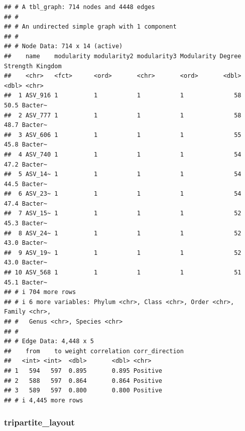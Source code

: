 \documentclass[
]{book}
\newenvironment{Shaded}{\begin{snugshade}}{\end{snugshade}}
\newcommand{\NormalTok}[1]{#1}
\newcommand{\SpecialCharTok}[1]{\textcolor[rgb]{0.81,0.36,0.00}{\textbf{#1}}}
\begin{document}
\begin{Shaded}
\end{Shaded}

\begin{verbatim}
## # A tbl_graph: 714 nodes and 4448 edges
## #
## # An undirected simple graph with 1 component
## #
## # Node Data: 714 x 14 (active)
##    name    modularity modularity2 modularity3 Modularity Degree Strength Kingdom
##    <chr>   <fct>      <ord>       <chr>       <ord>       <dbl>    <dbl> <chr>  
##  1 ASV_916 1          1           1           1              58     50.5 Bacter~
##  2 ASV_777 1          1           1           1              58     48.7 Bacter~
##  3 ASV_606 1          1           1           1              55     45.8 Bacter~
##  4 ASV_740 1          1           1           1              54     47.2 Bacter~
##  5 ASV_14~ 1          1           1           1              54     44.5 Bacter~
##  6 ASV_23~ 1          1           1           1              54     47.4 Bacter~
##  7 ASV_15~ 1          1           1           1              52     45.3 Bacter~
##  8 ASV_24~ 1          1           1           1              52     43.0 Bacter~
##  9 ASV_19~ 1          1           1           1              52     43.0 Bacter~
## 10 ASV_568 1          1           1           1              51     45.1 Bacter~
## # i 704 more rows
## # i 6 more variables: Phylum <chr>, Class <chr>, Order <chr>, Family <chr>,
## #   Genus <chr>, Species <chr>
## #
## # Edge Data: 4,448 x 5
##    from    to weight correlation corr_direction
##   <int> <int>  <dbl>       <dbl> <chr>         
## 1   594   597  0.895       0.895 Positive      
## 2   588   597  0.864       0.864 Positive      
## 3   589   597  0.800       0.800 Positive      
## # i 4,445 more rows
\end{verbatim}

\subsubsection{tripartite\_layout}\label{tripartite_layout}
\end{document}
